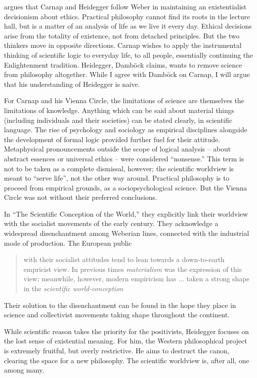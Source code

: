 \documentclass[leqno, 12pt]{turabian-researchpaper}
\begin{document}
	\autocite{dambock2022} argues that Carnap and Heidegger follow Weber in
	maintaining an existentialist decisionism about ethics. Practical philosophy cannot
	find its roots in the lecture hall, but is a matter of an analysis of life as
	we live it every day. Ethical decisions arise from the totality of existence,
	not from detached principles. But the two thinkers move in opposite directions.
	Carnap wishes to apply the instrumental thinking of scientific logic to
	everyday life, to all people, essentially continuing the Enlightenment
	tradition. Heidegger, Damb\"ock claims, wants to remove science from philosophy
	altogether. While I agree with Damb\"ock on Carnap, I will argue that his understanding
	of Heidegger is naive.

	For Carnap and his Vienna Circle, the limitations of science are themselves
	the limitations of knowledge. Anything which can be said about material things
	(including individuals and their societies) can be stated clearly, in
	scientific language. The rise of psychology and sociology as empirical disciplines
	alongside the development of formal logic provided further fuel for their attitude.
	Metaphysical pronouncements outside the scope of logical analysis -- about abstract
	essences or universal ethics -- were considered \enquote{nonsense.} This term is
	not to be taken as a complete dismissal, however; the scientific worldview is meant
	to \enquote{serve life}, not the other way around. Practical philosophy is to
	proceed from empirical grounds, as a sociopsychological science. But the
	Vienna Circle was not without their preferred conclusions.

	In \enquote{The Scientific Conception of the World,} \nocite{hahn1973} they
	explicitly link their worldview with the socialist movements of the early 
	century. They acknowledge a widespread disenchantment among Weberian lines, connected
	with the industrial mode of production. The European public \blockquote[{\cite[21f]{hahn1973}}]{with their socialist attitudes tend to lean towards a down-to-earth empricist view. In previous times \emph{materialism} was the expression of this view; meanwhile, however, modern empiricism has ... taken a strong shape in the \emph{scientific world-conception}}.
	Their solution to the disenchantment can be found in the hope they place in science
	and collectivist movements taking shape throughout the continent.

	While scientific reason takes the priority for the positivists, Heidegger
	focuses on the lost sense of existential meaning. For him, the Western
	philosophical project is extremely fruitful, but overly restrictive. He aims
	to destruct the canon, clearing the space for a new philosophy. The scientific
	worldview is, after all, one among many.
\end{document}
